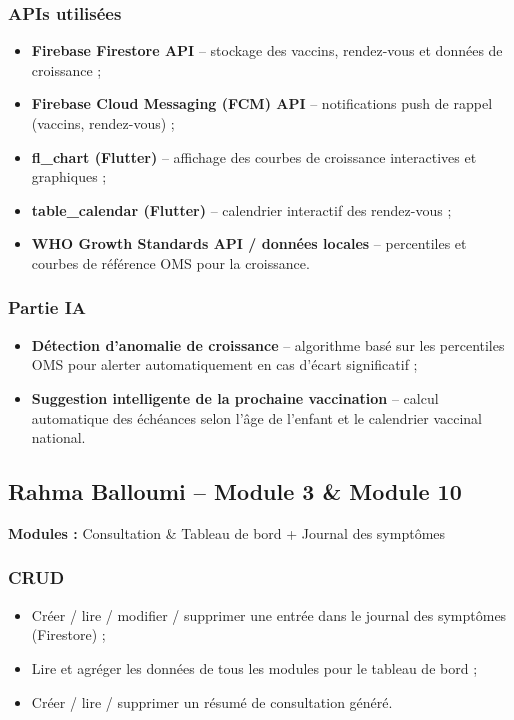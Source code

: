\documentclass[11pt,a4paper]{article}
\begin{document}
\subsubsection*{APIs utilisées}
\begin{itemize}
  \item \textbf{Firebase Firestore API} -- stockage des vaccins, rendez-vous et données de croissance ;
  \item \textbf{Firebase Cloud Messaging (FCM) API} -- notifications push de rappel (vaccins, rendez-vous) ;
  \item \textbf{fl\_chart (Flutter)} -- affichage des courbes de croissance interactives et graphiques ;
  \item \textbf{table\_calendar (Flutter)} -- calendrier interactif des rendez-vous ;
  \item \textbf{WHO Growth Standards API / données locales} -- percentiles et courbes de référence OMS pour la croissance.
\end{itemize}

\subsubsection*{Partie IA}
\begin{itemize}
  \item \textbf{Détection d'anomalie de croissance} -- algorithme basé sur les percentiles OMS pour alerter automatiquement en cas d'écart significatif ;
  \item \textbf{Suggestion intelligente de la prochaine vaccination} -- calcul automatique des échéances selon l'âge de l'enfant et le calendrier vaccinal national.
\end{itemize}

\vspace{0.5cm}
\subsection{Rahma Balloumi -- Module 3 \& Module 10}

\textbf{Modules :} Consultation \& Tableau de bord + Journal des symptômes

\subsubsection*{CRUD}
\begin{itemize}
  \item Créer / lire / modifier / supprimer une entrée dans le journal des symptômes (Firestore) ;
  \item Lire et agréger les données de tous les modules pour le tableau de bord ;
  \item Créer / lire / supprimer un résumé de consultation généré.
\end{itemize}
\end{document}

